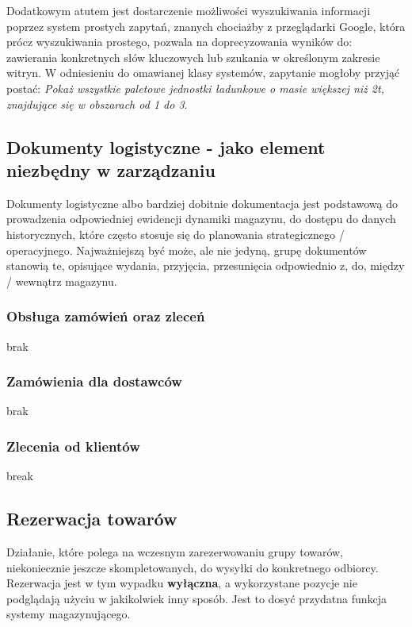 		Dodatkowym atutem jest dostarczenie możliwości wyszukiwania informacji poprzez system prostych zapytań, 
		znanych chociażby z przeglądarki Google, która prócz wyszukiwania prostego, pozwala na doprecyzowania
		wyników do: zawierania konkretnych słów kluczowych lub szukania w określonym zakresie witryn. W odniesieniu
		do omawianej klasy systemów, zapytanie mogłoby przyjąć postać: \emph{Pokaż wszystkie paletowe jednostki
		ładunkowe o masie większej niż 2t, znajdujące się w obszarach od 1 do 3}. 
%
%
	\subsection{Dokumenty logistyczne - jako element niezbędny w zarządzaniu}
		Dokumenty logistyczne albo bardziej dobitnie dokumentacja jest podstawową do prowadzenia odpowiedniej
		ewidencji dynamiki magazynu, do dostępu do danych historycznych, które często stosuje się
		do planowania strategicznego / operacyjnego. Najważniejszą być może, ale nie jedyną, grupę dokumentów
		stanowią te, opisujące wydania, przyjęcia, przesunięcia odpowiednio z, do, między / wewnątrz magazynu.
	\subsubsection{Obsługa zamówień oraz zleceń}
		brak
	\subsubsection{Zamówienia dla dostawców}
		brak
	\subsubsection{Zlecenia od klientów}
		break
	\subsection{Rezerwacja towarów}
		Działanie, które polega na wczesnym zarezerwowaniu grupy towarów, niekoniecznie jeszcze skompletowanych,
		do wysyłki do konkretnego odbiorcy. Rezerwacja jest w tym wypadku \textbf{wyłączna}, a wykorzystane
		pozycje nie podglądają użyciu w jakikolwiek inny sposób. Jest to dosyć przydatna funkcja systemy magazynującego.\\
		

